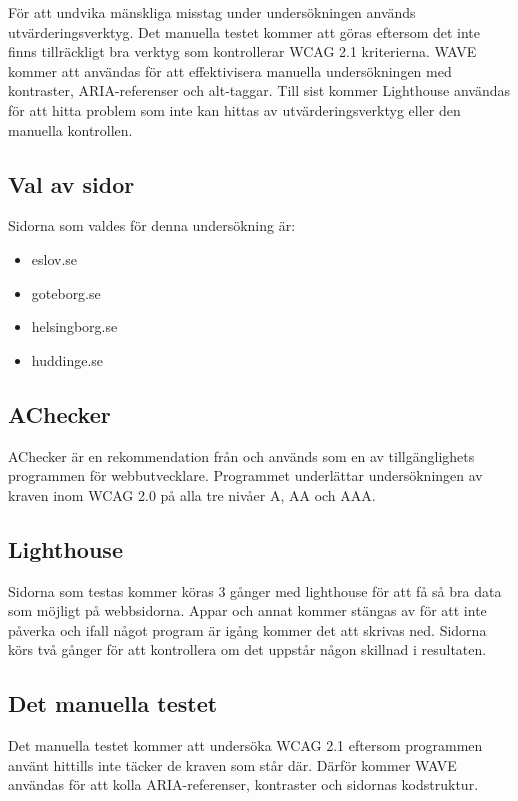 \documentclass[11p]{article}
\begin{document}
    För att undvika mänskliga misstag under undersökningen används utvärderingsverktyg.
    Det manuella testet kommer att göras eftersom det inte finns tillräckligt bra verktyg som kontrollerar WCAG 2.1 kriterierna.
    WAVE kommer att användas för att effektivisera manuella undersökningen med kontraster, ARIA-referenser och alt-taggar.
    Till sist kommer Lighthouse användas för att hitta problem som inte kan hittas av utvärderingsverktyg eller den manuella kontrollen.

    \subsection{Val av sidor}
    Sidorna som valdes för denna undersökning är:

    \begin{itemize}
        \item eslov.se
        \item goteborg.se
        \item helsingborg.se
        \item huddinge.se
    \end{itemize}

    \subsection{AChecker}
    AChecker är en rekommendation från \textcite{AChecker} och används som en av tillgänglighets programmen för webbutvecklare.
    Programmet underlättar undersökningen av kraven inom WCAG 2.0 på alla tre nivåer A, AA och AAA.

    \subsection{Lighthouse}
    Sidorna som testas kommer köras 3 gånger med lighthouse för att få så bra data som möjligt på webbsidorna.
    Appar och annat kommer stängas av för att inte påverka och ifall något program är igång kommer det att skrivas ned.
    Sidorna körs två gånger för att kontrollera om det uppstår någon skillnad i resultaten.

    \subsection{Det manuella testet}
    Det manuella testet kommer att undersöka WCAG 2.1 eftersom programmen använt hittills inte täcker de kraven som står där.
    Därför kommer WAVE användas för att kolla ARIA-referenser, kontraster och sidornas kodstruktur.
\end{document}
